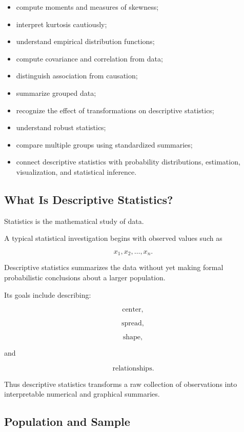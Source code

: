 {\begin{itemize}
    \item compute moments and measures of skewness;
    \item interpret kurtosis cautiously;
    \item understand empirical distribution functions;
    \item compute covariance and correlation from data;
    \item distinguish association from causation;
    \item summarize grouped data;
    \item recognize the effect of transformations on descriptive
          statistics;
    \item understand robust statistics;
    \item compare multiple groups using standardized summaries;
    \item connect descriptive statistics with probability distributions,
          estimation, visualization, and statistical inference.
\end{itemize}
}

\subsection{What Is Descriptive Statistics?}
\label{subsec:what-is-descriptive-statistics}

Statistics is the mathematical study of data.

A typical statistical investigation begins with observed values such as

\[
x_1,x_2,\ldots,x_n.
\]

Descriptive statistics summarizes the data without yet making formal
probabilistic conclusions about a larger population.

Its goals include describing:

\[
\boxed{
\text{center},
}
\]

\[
\boxed{
\text{spread},
}
\]

\[
\boxed{
\text{shape},
}
\]

and

\[
\boxed{
\text{relationships}.
}
\]

Thus descriptive statistics transforms a raw collection of observations
into interpretable numerical and graphical summaries.

\subsection{Population and Sample}
\label{subsec:population-sample}

